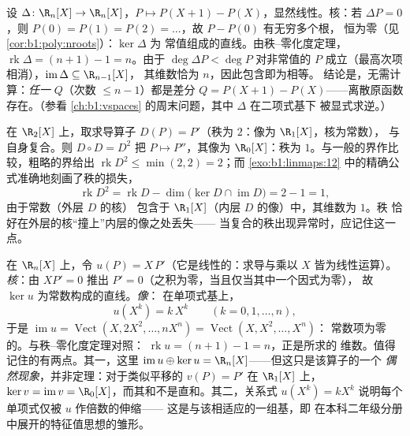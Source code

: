 \begin{example}
\label{ex:b1:linmaps:delta}
设 $\Delta \colon \R_n[X] \to \R_n[X]$，$P \mapsto P(X+1) -
P(X)$，显然线性。核：若 $\Delta P = 0$，则 $P(0) = P(1) =
P(2) = \dots$，故 $P - P(0)$ 有无穷多个根，
恒为零（见\cref{cor:b1:poly:nroots}）：$\ker\Delta$ 为
常值组成的直线。由秩--零化度定理，$\operatorname{rk}\Delta = (n + 1) - 1
= n$。由于 $\deg \Delta P < \deg P$ 对非常值的 $P$ 成立（最高次项
相消），$\operatorname{im}\Delta \subseteq \R_{n-1}[X]$，
其维数恰为 $n$，因此包含即为相等。
结论是，无需计算：\emph{任一}
 $Q$（次数 $\leq n - 1$）都是差分 $Q = P(X+1)
- P(X)$——离散原函数存在。（参看
\cref{ch:b1:vspaces} 的周末问题，其中 $\Delta$ 在二项式基下
被显式求逆。）
\end{example}

\begin{example}[复合映射中的秩的核算]
\label{ex:b1:linmaps:rankbookkeeping}
在 $\R_2[X]$ 上，取求导算子 $D(P) = P'$（秩为 $2$：像为 $\R_1[X]$，核为常数），
与自身复合。则 $D
\circ D = D^2$ 把 $P \mapsto P''$，其像为 $\R_0[X]$：秩为
$1$。与一般的界作比较，粗略的界给出
$\operatorname{rk} D^2 \leq \min(2, 2) = 2$；而
\cref{exo:b1:linmaps:12} 中的精确公式准确地刻画了秩的损失，
\[
\operatorname{rk} D^2 = \operatorname{rk} D -
\dim\bigl(\ker D \cap \operatorname{im} D\bigr) = 2 - 1 = 1 ,
\]
由于常数（外层 $D$ 的核）
包含于 $\R_1[X]$（内层 $D$ 的像）中，其维数为 $1$。秩
恰好在外层的核“撞上”内层的像之处丢失——
当复合的秩出现异常时，应记住这一点。
\end{example}

\begin{example}[欧拉算子的核与像]
\label{ex:b1:linmaps:euler}
在 $\R_n[X]$ 上，令 $u(P) = X\,P'$（它是线性的：求导与乘以 $X$ 皆为线性运算）。
\emph{核}：由 $XP' = 0$ 推出 $P' =
0$（之积为零，当且仅当其中一个因式为零），
故 $\ker u$ 为常数构成的直线。\emph{像}：
在单项式基上，
\[
u(X^k) = k\,X^{k} \qquad (k = 0, 1, \dots, n),
\]
于是 $\operatorname{im} u = \operatorname{Vect}(X, 2X^2, \dots,
nX^n) = \operatorname{Vect}(X, X^2, \dots, X^n)$：
常数项为零的。与秩–零化度定理对照：
$\operatorname{rk} u = (n + 1) - 1 = n$，正是所求的
维数。值得记住的有两点。其一，这里
$\operatorname{im} u \oplus \ker u = \R_n[X]$——但这只是该算子的一个
\emph{偶然现象}，并非定理：对于类似平移的
$v(P) = P'$ 在 $\R_1[X]$ 上，$\ker v = \operatorname{im}
v = \R_0[X]$，而其和不是直和。其二，关系式
$u(X^k) = kX^k$ 说明每个单项式仅被 $u$ 作倍数的伸缩——
这是与该相适应的一组基，即
在本科二年级分册中展开的特征值思想的雏形。
\end{example}

